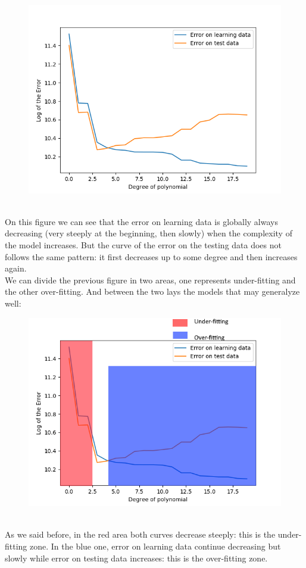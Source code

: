 \documentclass[a4paper, 10pt]{article}
\begin{document}
\begin{figure}
\centering
	\includegraphics[scale=0.7]{ex1a_error}
\end{figure}
\\
On this figure we can see that the error on learning data is globally always decreasing (very steeply at the beginning, then slowly)
when the complexity of the model increases. But the curve of the error on the testing data does not follows the same pattern: it first 
decreases up to some degree and then increases again. 
\\
We can divide the previous figure in two areas, one represents under-fitting and the other over-fitting. And between the 
two lays the models that may generalyze well:
\\
\begin{figure}
\centering
	\includegraphics[scale=0.7]{ex1a_area}
\end{figure}
\\
As we said before, in the red area both curves decrease steeply: this is the under-fitting zone.
In the blue one, error on learning data continue decreasing but slowly while error on testing data increases:
this is the over-fitting zone.
\end{document}
